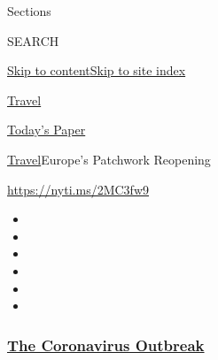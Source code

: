 Sections

SEARCH

\protect\hyperlink{site-content}{Skip to
content}\protect\hyperlink{site-index}{Skip to site index}

\href{https://www.nytimes3xbfgragh.onion/section/travel}{Travel}

\href{https://myaccount.nytimes3xbfgragh.onion/auth/login?response_type=cookie\&client_id=vi}{}

\href{https://www.nytimes3xbfgragh.onion/section/todayspaper}{Today's
Paper}

\href{/section/travel}{Travel}\textbar{}Europe's Patchwork Reopening

\url{https://nyti.ms/2MC3fw9}

\begin{itemize}
\item
\item
\item
\item
\item
\item
\end{itemize}

\hypertarget{the-coronavirus-outbreak}{%
\subsubsection{\texorpdfstring{\href{https://www.nytimes3xbfgragh.onion/news-event/coronavirus?name=styln-coronavirus-national\&region=TOP_BANNER\&variant=undefined\&block=storyline_menu_recirc\&action=click\&pgtype=Article\&impression_id=e424d9f0-e384-11ea-a632-91c271f5eaab}{The
Coronavirus
Outbreak}}{The Coronavirus Outbreak}}\label{the-coronavirus-outbreak}}

